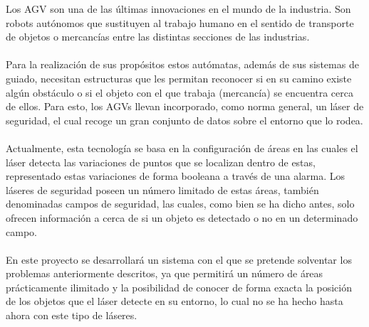
Los AGV \cite{AGVdes} son una de las últimas innovaciones en el mundo de la industria. Son robots autónomos que sustituyen al trabajo humano en el sentido de transporte de objetos o mercancías entre las distintas secciones de las industrias. \\
\\
Para la realización de sus propósitos estos autómatas, además de sus sistemas de guiado, necesitan estructuras que les permitan reconocer si en su camino existe algún obstáculo o si el objeto con el que trabaja (mercancía) se encuentra cerca de ellos. Para esto, los AGVs llevan incorporado, como norma general, un láser de seguridad, el cual recoge un gran conjunto de datos sobre el entorno que lo rodea.\\
\\
Actualmente, esta tecnología se basa en la configuración de áreas en las cuales el láser detecta las variaciones de puntos que se localizan dentro de estas, representado estas variaciones de forma booleana a través de una alarma. Los láseres de seguridad poseen un número limitado de estas áreas, también denominadas campos de seguridad, las cuales, como bien se ha dicho antes, solo ofrecen información a cerca de si un objeto es detectado o no en un determinado campo.\\
\\
En este proyecto se desarrollará un sistema con el que se pretende solventar los problemas anteriormente descritos, ya que permitirá un número de áreas prácticamente ilimitado y la posibilidad de conocer de forma exacta la posición de los objetos que el láser detecte en su entorno, lo cual no se ha hecho hasta ahora con este tipo de láseres.\\
\\
